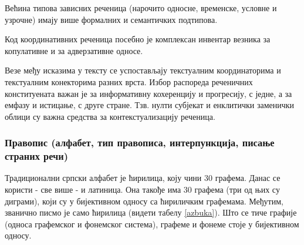 {\begin{multicols}{2}
Већина типова зависних реченица (нарочито односне, временске, условне и узрочне) имају више формалних и семантичких подтипова. 

Код координативних реченица посебно је комплексан инвентар везника за копулативне и за адверзативне односе.

Везе међу исказима у тексту се успостављају текстуалним координаторима и текстуалним конекторима разних врста. Избор распореда реченичних конституената важан је за информативну кохеренцију и прогресију, с једне, а за емфазу и истицање, с друге стране. Тзв. нулти субјекат и енклитички заменички облици су важна средства за контекстуализацију реченица.


\subsubsection {Правопис (алфабет, тип правописа, интерпункција, писање страних речи)}
  
Традиционални српски алфабет је ћирилица, коју чини 30 графема. Данас се користи - све више - и латиница. Она такође има 30 графема (три од њих су диграми), који су у бијективном односу са ћириличким графемама. Међутим, званично писмо је само ћирилица (видети табелу \ref{azbuka}).
Што се тиче графије (односа графемског и фонемског система), графеме и фонеме стоје  у бијективном односу.


\end{multicols}}
